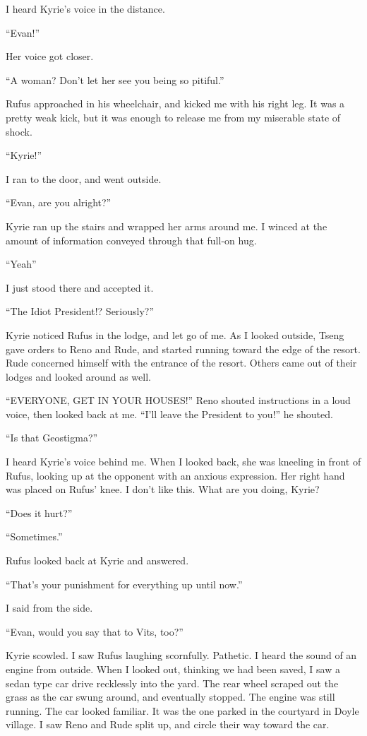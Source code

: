 \documentclass[oneside]{book}
\begin{document}
I heard Kyrie’s voice in the distance.

“Evan!”

Her voice got closer.

“A woman? Don’t let her see you being so pitiful.”

Rufus approached in his wheelchair, and kicked me with his right leg. It was a pretty weak kick, but it was enough to release me from my miserable state of shock.

“Kyrie!”

I ran to the door, and went outside.

“Evan, are you alright?”

Kyrie ran up the stairs and wrapped her arms around me. I winced at the amount of information conveyed through that full-on hug.

“Yeah”

I just stood there and accepted it.

“The Idiot President!? Seriously?”

Kyrie noticed Rufus in the lodge, and let go of me. As I looked outside, Tseng gave orders to Reno and Rude, and started running toward the edge of the resort. Rude concerned himself with the entrance of the resort. Others came out of their lodges and looked around as well.

“EVERYONE, GET IN YOUR HOUSES!” Reno shouted instructions in a loud voice, then looked back at me. “I’ll leave the President to you!” he shouted.

“Is that Geostigma?”

I heard Kyrie’s voice behind me. When I looked back, she was kneeling in front of Rufus, looking up at the opponent with an anxious expression. Her right hand was placed on Rufus’ knee. I don’t like this. What are you doing, Kyrie?

“Does it hurt?”

“Sometimes.”

Rufus looked back at Kyrie and answered.

“That’s your punishment for everything up until now.”

I said from the side.

“Evan, would you say that to Vits, too?”

Kyrie scowled. I saw Rufus laughing scornfully. Pathetic. I heard the sound of an engine from outside. When I looked out, thinking we had been saved, I saw a sedan type car drive recklessly into the yard. The rear wheel scraped out the grass as the car swung around, and eventually stopped. The engine was still running. The car looked familiar. It was the one parked in the courtyard in Doyle village. I saw Reno and Rude split up, and circle their way toward the car.
\end{document}
